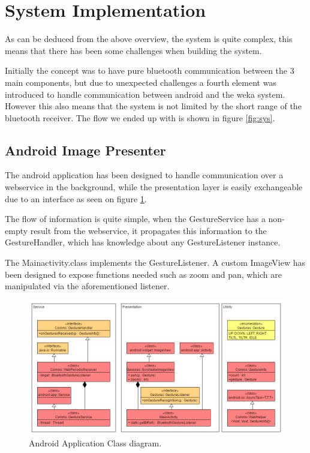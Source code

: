 \section{System Implementation} 
As can be deduced from the above overview, the system is quite complex,
this means that there has been some challenges when building the system.

Initially the concept was to have pure bluetooth communication between the 3 main components,
but due to unexpected challenges a fourth element was introduced to handle communication between android and the weka system. 
However this also means that the system is not limited by the short range of the bluetooth receiver.
The flow we ended up with is shown in figure \ref{fig:sys}.

\subsection{Android Image Presenter}
The android application has been designed to handle communication over a webservice in the background, 
while the presentation layer is easily exchangeable due to an interface as seen on figure \ref{fig:and_class}.


The flow of information is quite simple, when the GestureService has a non-empty result from the webservice,
it propagates this information to the GestureHandler, which has knowledge about any GestureListener instance.


The Mainactivity.class implements the GestureListener.
A custom ImageView has been designed to expose functions needed such as zoom and pan, which are manipulated via the aforementioned listener.

\begin{figure}[!h]
\centering
\includegraphics[width=1\columnwidth]{img/android_class_diagram}
\caption{Android Application Class diagram.}
\label{fig:and_class}
\end{figure}

